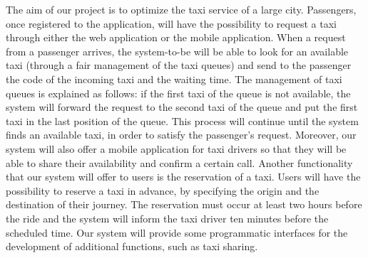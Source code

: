 The aim of our project is to optimize the taxi service of a large city. 
Passengers, once registered to the application, will have the possibility to request a taxi through either the web application or the mobile application. When a request from a passenger arrives, the system-to-be will be able to look for an available taxi (through a fair management of the taxi queues) and send to the passenger the code of the incoming taxi and the waiting time. 
\newline
The management of taxi queues is explained as follows: if the first taxi of the queue is not available, the system will forward the request to the second taxi of the queue and put the first taxi in the last position of the queue. This process will continue until the system finds an available taxi, in order to satisfy the passenger's request.
\newline
Moreover, our system will also offer a mobile application for taxi drivers so that they will be able to share their availability and confirm a certain call.
\newline
Another functionality that our system will offer to users is the reservation of a taxi. Users will have the possibility to reserve a taxi in advance, by specifying the origin and the destination of their journey. The reservation must occur at least two hours before the ride and the system will inform the taxi driver ten minutes before the scheduled time.
\newline
Our system will provide some programmatic interfaces for the development of additional functions, such as taxi sharing.